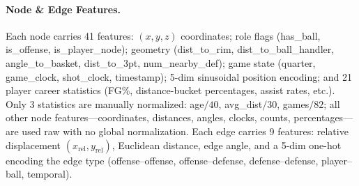\documentclass{article}
\begin{document}
\paragraph{Node \& Edge Features.}
\hypertarget{app:features}{}
Each node carries 41 features: $(x,y,z)$ coordinates; role flags (has\_ball, is\_offense, is\_player\_node); geometry (dist\_to\_rim, dist\_to\_ball\_handler, angle\_to\_basket, dist\_to\_3pt, num\_nearby\_def); game state (quarter, game\_clock, shot\_clock, timestamp); 5-dim sinusoidal position encoding; and 21 player career statistics (FG\%, distance-bucket percentages, assist rates, etc.). Only 3 statistics are manually normalized: age$/40$, avg\_dist$/30$, games$/82$; all other node features---coordinates, distances, angles, clocks, counts, percentages---are used raw with no global normalization. Each edge carries 9 features: relative displacement $(x_{\text{rel}}, y_{\text{rel}})$, Euclidean distance, edge angle, and a 5-dim one-hot encoding the edge type (offense--offense, offense--defense, defense--defense, player--ball, temporal).

\clearpage


\end{document}
